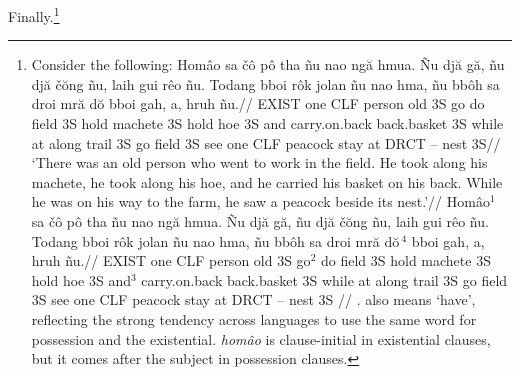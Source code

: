 Finally.\footnote{%
Consider the following:
\pex[nopreamble]\let\\=\uppercase
\a
\begingl
\gla
Hom\^{a}o sa \v{c}\^{o} p\^{o} tha  \~{n}u nao ng\u{a} hmua. \~{N}u
dj\u{a} g\u{a}, \~{n}u dj\u{a} \v{c}\u{o}ng \~{n}u, laih gui r\^{e}o
\~{n}u. Todang bboi r\^{o}k jolan \~{n}u nao hma, \~{n}u bb\^{o}h sa
droi mr\u{a} d\u{o} bboi gah, a, hruh \~{n}u.//
\glb
\\{exist} one \\{clf} person old \\{3s} go do field \\{3s} hold
machete \\{3s} hold hoe \\{3s} and carry.on.back back.basket \\{3s}
while at along trail \\{3s} go field \\{3s} see one \\{clf} peacock
stay at \\{drct} -- nest \\{3s}//
\glft
`There was an old person who went to work in the field. He took
along his machete, he took along his hoe, and he carried his
basket on his back. While he was on his way to the farm, he saw a
peacock beside its nest.'//
\endgl
\a
\beginglpanel[ssratio=.4,glhangstyle=none]
\gla Hom\^{a}o$^1$ sa \v{c}\^{o} p\^{o} tha  \~{n}u nao ng\u{a}
hmua. \~{N}u dj\u{a} g\u{a}, \~{n}u dj\u{a} \v{c}\u{o}ng \~{n}u,
laih gui r\^{e}o \~{n}u. Todang bboi r\^{o}k jolan \~{n}u nao
hma, \~{n}u bb\^{o}h sa droi mr\u{a} d\u{o}$\,^4$ bboi gah, a, hruh
\~{n}u.//
\glb \\{exist} one \\{clf} person old \\{3s} go$^2$ do field
\\{3s} hold machete \\{3s} hold hoe \\{3s} and$^3$ carry.on.back
back.basket \\{3s} while at along trail \\{3s} go field \\{3s}
see one \\{clf} peacock stay at \\{drct} -- nest \\{3s}
//
. also means `have', reflecting the
strong tendency across languages to use the same word for
possession and the existential. {\it hom\^{a}o} is clause-initial
in existential clauses, but it comes after the subject in
possession clauses.

}
